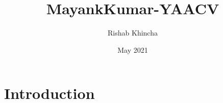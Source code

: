 \documentclass{article}
\title{MayankKumar-YAACV}
\author{Rishab Khincha}
\date{May 2021}
\begin{document}
\maketitle

\section{Introduction}
\end{document}
